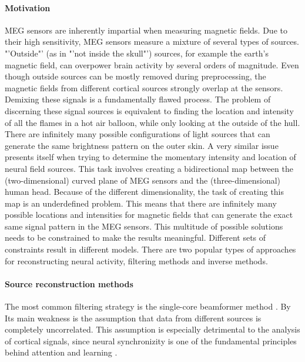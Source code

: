 \paragraph{Motivation}
MEG sensors are inherently impartial when measuring magnetic fields.
Due to their high sensitivity, MEG sensors measure a mixture of several types of sources.
"'Outside"' (as in "'not inside the skull"') sources, for example the earth's magnetic field, can overpower brain activity by several orders of magnitude.
Even though outside sources can be mostly removed during preprocessing, the magnetic fields from different cortical sources strongly overlap at the sensors.
Demixing these signals is a fundamentally flawed process.
The problem of discerning these signal sources is equivalent to finding the location and intensity of all the flames in a hot air balloon, while only looking at the outside of the hull.
There are infinitely many possible configurations of light sources that can generate the same brightness pattern on the outer skin.
A very similar issue presents itself when trying to determine the momentary intensity and location of neural field sources.
This task involves creating a bidirectional map between the (two-dimensional) curved plane of MEG sensors and the (three-dimensional) human head.
Because of the different dimensionality, the task of creating this map is an underdefined problem.
This means that there are infinitely many possible locations and intensities for magnetic fields that can generate the exact same signal pattern in the MEG sensors.
This multitude of possible solutions needs to be constrained to make the results meaningful.
Different sets of constraints result in different models.
There are two popular types of approaches for reconstructing neural activity, filtering methods and inverse methods.

\paragraph{Source reconstruction methods}
The most common filtering strategy is the single-core beamformer method \cite{1.5.Beamformer-a, 1.5.Beamformer-b}.
By 
Its main weakness is the assumption that data from different sources is completely uncorrelated.
This assumption is especially detrimental to the analysis of cortical signals, since neural synchronizity is one of the fundamental principles behind attention and learning \cite{1.5.synchronizity}.

